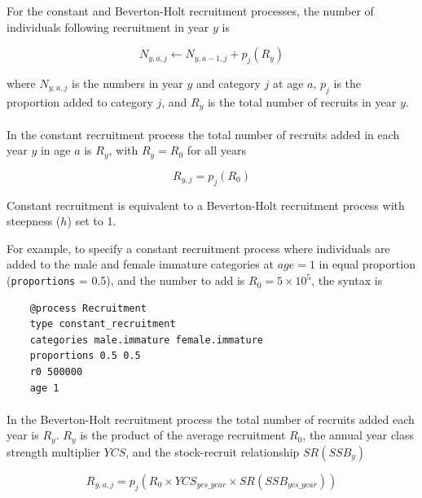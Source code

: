 For the constant and Beverton-Holt recruitment processes, the  number of individuals following recruitment in year $y$ is

\begin{equation}
N_{y,a,j} \leftarrow N_{y,a - 1,j} + p_j(R_y)
\end{equation}

where $N_{y,a,j}$ is the numbers in year $y$ and category $j$ at age $a$, $p_j$ is the proportion added to category $j$, and $R_y$ is the total number of recruits in year $y$.

\paragraph{}\label{subsubsec:constant-recruitment}

In the constant recruitment process the total number of recruits added in each year $y$ in age $a$ is $R_y$, with $R_y = R_0$ for all years

\begin{equation}
  R_{y,j} = p_j(R_0)
\end{equation}

Constant recruitment is equivalent to a Beverton-Holt recruitment process with steepness ($h$) set to 1.

For example, to specify a constant recruitment process where individuals are added to the male and female immature categories at $age=1$ in equal proportion (\texttt{proportions} = 0.5), and the number to add is $R_0=5 \times 10^5$, the syntax is

{\small{\begin{verbatim}
	@process Recruitment
	type constant_recruitment
	categories male.immature female.immature
	proportions 0.5 0.5
	r0 500000
	age 1
\end{verbatim}}}

\paragraph{}\label{subsubsec:BH-recruitment}

In the Beverton-Holt recruitment process the total number of recruits added each year is $R_y$. $R_y$ is the product of the average recruitment $R_0$, the annual year class strength multiplier $YCS$, and the stock-recruit relationship $SR(SSB_y)$

\begin{equation}\label{eq:BH}
  R_{y,a,j} = p_j(R_0 \times YCS_{ycs\_year} \times SR(SSB_{ycs\_year}))
\end{equation}

